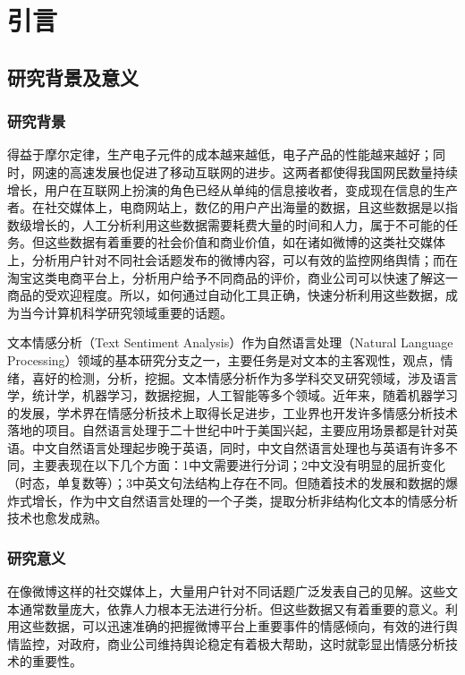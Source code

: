 \chapter{引言}

\section{研究背景及意义}
\subsection{研究背景}
得益于摩尔定律\cite{moore1975progress}，生产电子元件的成本越来越低，电子产品的性能越来越好；同时，网速的高速发展也促进了移动互联网的进步。这两者都使得我国网民数量持续增长，用户在互联网上扮演的角色已经从单纯的信息接收者，变成现在信息的生产者。在社交媒体上，电商网站上，数亿的用户产出海量的数据，且这些数据是以指数级增长的，人工分析利用这些数据需要耗费大量的时间和人力，属于不可能的任务。但这些数据有着重要的社会价值和商业价值，如在诸如微博的这类社交媒体上，分析用户针对不同社会话题发布的微博内容，可以有效的监控网络舆情\cite{舆情监控}；而在淘宝这类电商平台上，分析用户给予不同商品的评价，商业公司可以快速了解这一商品的受欢迎程度。所以，如何通过自动化工具正确，快速分析利用这些数据，成为当今计算机科学研究领域重要的话题。

文本情感分析（Text Sentiment Analysis）作为自然语言处理（Natural Language Processing）领域的基本研究分支之一，主要任务是对文本的主客观性，观点，情绪，喜好的检测，分析，挖掘。文本情感分析作为多学科交叉研究领域，涉及语言学，统计学，机器学习，数据挖掘，人工智能等多个领域。近年来，随着机器学习的发展，学术界在情感分析技术上取得长足进步，工业界也开发许多情感分析技术落地的项目。自然语言处理于二十世纪中叶于美国兴起，主要应用场景都是针对英语。中文自然语言处理起步晚于英语，同时，中文自然语言处理也与英语有许多不同，主要表现在以下几个方面：{\large{\textcircled{\small{1}}}}中文需要进行分词；{\large{\textcircled{\small{2}}}}中文没有明显的屈折变化（时态，单复数等）；{\large{\textcircled{\small{3}}}}中英文句法结构上存在不同。但随着技术的发展和数据的爆炸式增长，作为中文自然语言处理的一个子类，提取分析非结构化文本的情感分析技术也愈发成熟。

\subsection{研究意义}
在像微博这样的社交媒体上，大量用户针对不同话题广泛发表自己的见解。这些文本通常数量庞大，依靠人力根本无法进行分析。但这些数据又有着重要的意义\cite{舆情监控,中文微博情感分析}。利用这些数据，可以迅速准确的把握微博平台上重要事件的情感倾向，有效的进行舆情监控，对政府，商业公司维持舆论稳定有着极大帮助，这时就彰显出情感分析技术的重要性。

